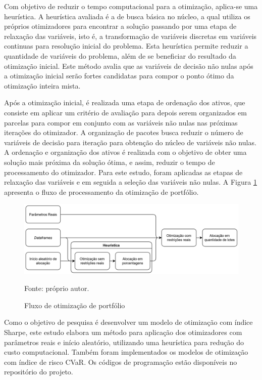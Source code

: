         \ipar Com objetivo de reduzir o tempo computacional para a otimização, aplica-se uma heurística. A heurística avaliada é a de busca básica no núcleo, a qual utiliza os próprios otimizadores para encontrar a solução passando por uma etapa de relaxação das variáveis, isto é, a transformação de variáveis discretas em variáveis continuas para resolução inicial do problema. Esta heurística permite reduzir a quantidade de variáveis do problema, além de se beneficiar do resultado da otimização inicial. Este método avalia que as variáveis de decisão não nulas após a otimização inicial serão fortes candidatas para compor o ponto ótimo da otimização inteira mista. 
        
        \ipar Após a otimização inicial, é realizada uma etapa de ordenação dos ativos, que consiste em aplicar um critério de avaliação para depois serem organizados em parcelas para compor em conjunto com as variáveis não nulas nas próximas iterações do otimizador. A organização de pacotes busca reduzir o número de variáveis de decisão para iteração para obtenção do núcleo de variáveis não nulas. A ordenação e organização dos ativos é realizada com o objetivo de obter uma solução mais próxima da solução ótima, e assim, reduzir o tempo de processamento do otimizador. Para este estudo, foram aplicadas as etapas de relaxação das variáveis e em seguida a seleção das variáveis não nulas. A Figura \ref{fig:fluxo_otimizacao} apresenta o fluxo de processamento da otimização de portfólio.

        \begin{figure}[H]
            \centering
            \caption{Fluxo de otimização de portfólio}
            \label{fig:fluxo_otimizacao}
            \includegraphics[width=\textwidth]{imagens/fluxo_otimizacao.png}
            \par \footnotesize Fonte: próprio autor.
        \end{figure}

        \ipar Como o objetivo de pesquisa é desenvolver um modelo de otimização com índice Sharpe, este estudo elabora um método para aplicação dos otimizadores com parâmetros reais e início aleatório, utilizando uma heurística para redução do custo computacional. Também foram implementados os modelos de otimização com índice de risco CVaR. Os códigos de programação estão disponíveis no repositório do projeto.
        
